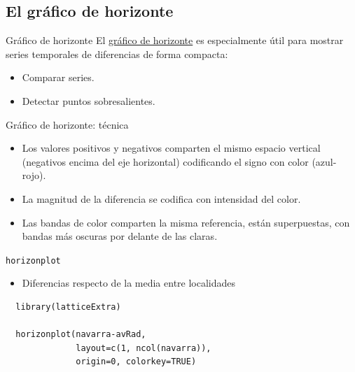\documentclass[xcolor={usenames,svgnames,dvipsnames}]{beamer}
\begin{document}
\subsection{El gráfico de horizonte}
\label{sec-3-3}

\begin{frame}[label=sec-3-3-1]{Gráfico de horizonte}
El \href{http://www.perceptualedge.com/articles/visual_business_intelligence/time_on_the_horizon.pdf}{gráfico de horizonte} es especialmente útil para mostrar series
temporales de diferencias de forma compacta:
\begin{itemize}
\item Comparar series.
\item Detectar puntos sobresalientes.
\end{itemize}
\end{frame}

\begin{frame}[label=sec-3-3-2]{Gráfico de horizonte: técnica}
\begin{itemize}
\item Los valores positivos y negativos comparten el mismo espacio
vertical (negativos encima del eje horizontal) codificando el signo
con color (azul-rojo).
\item La magnitud de la diferencia se codifica con intensidad del color.
\item Las bandas de color comparten la misma referencia, están
superpuestas, con bandas más oscuras por delante de las claras.
\end{itemize}
\end{frame}

\begin{frame}[fragile,label=sec-3-3-3]{\texttt{horizonplot}}
 \begin{itemize}
\item Diferencias respecto de la media entre localidades
\end{itemize}
\lstset{language=R,label= ,caption= ,numbers=none}
\begin{lstlisting}
  library(latticeExtra)
  
  horizonplot(navarra-avRad,
              layout=c(1, ncol(navarra)),
              origin=0, colorkey=TRUE)
\end{lstlisting}
\end{frame}
\end{document}
